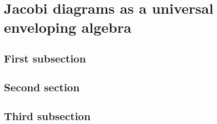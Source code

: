 \chapter{Jacobi diagrams as a universal enveloping algebra}

\section{First subsection}

\section{Second section}

\section{Third subsection}
